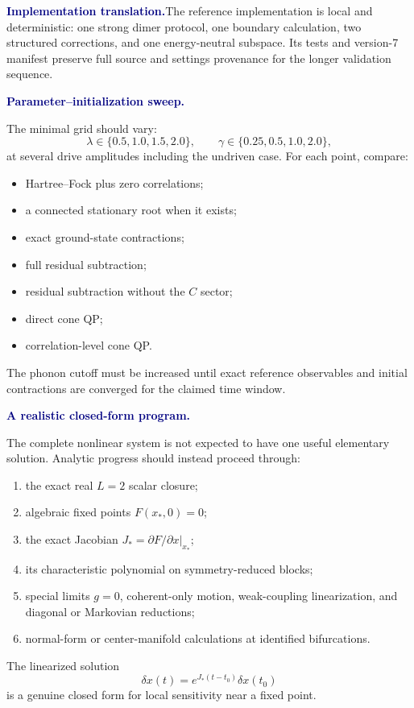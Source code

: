 \documentclass[10pt]{article}
\newcommand{\pedbox}[2]{%
  \par\medskip
  \noindent\colorbox{pale}{%
    \parbox{\dimexpr\linewidth-2\fboxsep\relax}{%
      \textcolor{navy}{\textbf{#1}}\quad #2%
    }%
  }\par\medskip
}
\newcommand{\implementationbox}[1]{\pedbox{Implementation translation.}{#1}}
\newcommand{\flowlead}[1]{%
  \par\medskip
  \needspace{3\baselineskip}%
  \noindent\textcolor{navy}{\textbf{#1.}}\enspace\ignorespaces
}
\begin{document}
\implementationbox{The reference implementation is local and deterministic:
one strong dimer protocol, one boundary calculation, two structured
corrections, and one energy-neutral subspace.  Its tests and version-7
manifest preserve full source and settings provenance for the longer
validation sequence.}

\flowlead{Parameter--initialization sweep}

The minimal grid should vary:
\[
\lambda\in\{0.5,1.0,1.5,2.0\},\qquad
\gamma\in\{0.25,0.5,1.0,2.0\},
\tag{7.1}
\]
at several drive amplitudes including the undriven case.  For each point,
compare:
\begin{itemize}
  \item Hartree--Fock plus zero correlations;
  \item a connected stationary root when it exists;
  \item exact ground-state contractions;
  \item full residual subtraction;
  \item residual subtraction without the \(C\) sector;
  \item direct cone QP;
  \item correlation-level cone QP.
\end{itemize}
The phonon cutoff must be increased until exact reference observables and
initial contractions are converged for the claimed time window.

\flowlead{A realistic closed-form program}

The complete nonlinear system is not expected to have one useful elementary
solution.  Analytic progress should instead proceed through:
\begin{enumerate}
  \item the exact real \(L=2\) scalar closure;
  \item algebraic fixed points \(F(x_\ast,0)=0\);
  \item the exact Jacobian
  \(J_\ast=\left.\partial F/\partial x\right|_{x_\ast}\);
  \item its characteristic polynomial on symmetry-reduced blocks;
  \item special limits \(g=0\), coherent-only motion, weak-coupling
  linearization, and diagonal or Markovian reductions;
  \item normal-form or center-manifold calculations at identified
  bifurcations.
\end{enumerate}
The linearized solution
\[
\delta x(t)=e^{J_\ast(t-t_0)}\delta x(t_0)
\tag{7.2}
\]
is a genuine closed form for local sensitivity near a fixed point.
\end{document}
